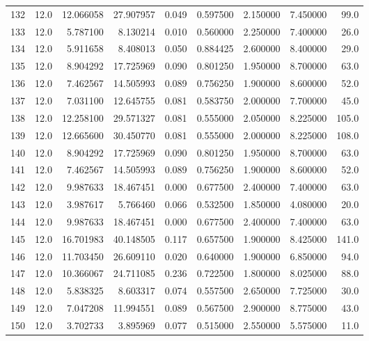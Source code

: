 \begin{tabular}{lrrrrrrrr}
132  &   12.0 &  12.066058 &  27.907957 &  0.049 &  0.597500 &  2.150000 &   7.450000 &   99.0 \\
133  &   12.0 &   5.787100 &   8.130214 &  0.010 &  0.560000 &  2.250000 &   7.400000 &   26.0 \\
134  &   12.0 &   5.911658 &   8.408013 &  0.050 &  0.884425 &  2.600000 &   8.400000 &   29.0 \\
135  &   12.0 &   8.904292 &  17.725969 &  0.090 &  0.801250 &  1.950000 &   8.700000 &   63.0 \\
136  &   12.0 &   7.462567 &  14.505993 &  0.089 &  0.756250 &  1.900000 &   8.600000 &   52.0 \\
137  &   12.0 &   7.031100 &  12.645755 &  0.081 &  0.583750 &  2.000000 &   7.700000 &   45.0 \\
138  &   12.0 &  12.258100 &  29.571327 &  0.081 &  0.555000 &  2.050000 &   8.225000 &  105.0 \\
139  &   12.0 &  12.665600 &  30.450770 &  0.081 &  0.555000 &  2.000000 &   8.225000 &  108.0 \\
140  &   12.0 &   8.904292 &  17.725969 &  0.090 &  0.801250 &  1.950000 &   8.700000 &   63.0 \\
141  &   12.0 &   7.462567 &  14.505993 &  0.089 &  0.756250 &  1.900000 &   8.600000 &   52.0 \\
142  &   12.0 &   9.987633 &  18.467451 &  0.000 &  0.677500 &  2.400000 &   7.400000 &   63.0 \\
143  &   12.0 &   3.987617 &   5.766460 &  0.066 &  0.532500 &  1.850000 &   4.080000 &   20.0 \\
144  &   12.0 &   9.987633 &  18.467451 &  0.000 &  0.677500 &  2.400000 &   7.400000 &   63.0 \\
145  &   12.0 &  16.701983 &  40.148505 &  0.117 &  0.657500 &  1.900000 &   8.425000 &  141.0 \\
146  &   12.0 &  11.703450 &  26.609110 &  0.020 &  0.640000 &  1.900000 &   6.850000 &   94.0 \\
147  &   12.0 &  10.366067 &  24.711085 &  0.236 &  0.722500 &  1.800000 &   8.025000 &   88.0 \\
148  &   12.0 &   5.838325 &   8.603317 &  0.074 &  0.557500 &  2.650000 &   7.725000 &   30.0 \\
149  &   12.0 &   7.047208 &  11.994551 &  0.089 &  0.567500 &  2.900000 &   8.775000 &   43.0 \\
150  &   12.0 &   3.702733 &   3.895969 &  0.077 &  0.515000 &  2.550000 &   5.575000 &   11.0 \\

\end{tabular}

